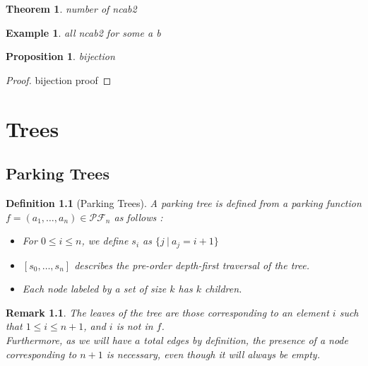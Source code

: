 \documentclass[12pt]{report}
\newtheorem{theorem}{Theorem}
\newtheorem*{prop}{Proposition}
\newtheorem{definition}{Definition}
\newtheorem*{example}{Example}
\newtheorem*{rem}{Remark}
\begin{document}
\begin{theorem}
    number of ncab2
\end{theorem}

\begin{example}
    all ncab2 for some a b
\end{example}

\begin{prop}
    bijection
\end{prop}

\begin{proof}
    bijection proof
\end{proof}

\chapter{Trees}

\section{Parking Trees}

\begin{definition}[Parking Trees]
    A \emph{parking tree} is defined from a parking
    function $f = (a_1, \ldots, a_n) \in \mathcal{PF}_n$
    as follows :
    \begin{itemize}
        \item For $0 \leqslant i \leqslant n$, we define
            $s_i$ as $\{j\ |\ a_j = i + 1\}$
        \item $[s_0, \ldots, s_n]$ describes the pre-order
            depth-first traversal of the tree.
        \item Each node labeled by a set of size $k$
            has $k$ children. 
    \end{itemize}
\end{definition}

\begin{rem}
    The leaves of the tree are those corresponding to an
    element $i$ such that $1 \leqslant i \leqslant n + 1$,
    and $i$ is \emph{not} in $f$.\\
    Furthermore, as we will have $a$ total edges by 
    definition, the presence of a node corresponding
    to $n + 1$ is necessary, even though it will always
    be empty.
\end{rem}
\end{document}
